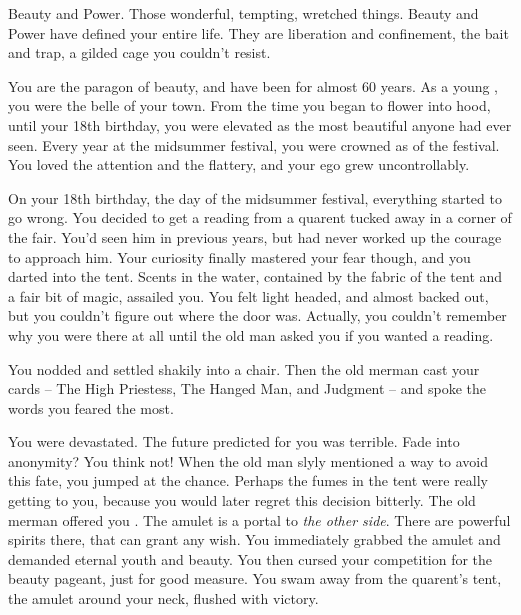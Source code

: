 \documentclass[char]{NeptuneBall}
\begin{document}
\name{\cWitch{}}




Beauty and Power. Those wonderful, tempting, wretched things. Beauty and Power have defined your entire life. They are liberation and confinement, the bait and trap, a gilded cage you couldn't resist.

You are the paragon of beauty, and have been for almost 60 years. As a young \cWitch{\mer}, you were the belle of your town. From the time you began to flower into \cWitch{\human}hood, until your 18th birthday, you were elevated as the most beautiful \cWitch{\mer} anyone had ever seen. Every year at the midsummer festival, you were crowned as \cWitch{\King} of the festival. You loved the attention and the flattery, and your ego grew uncontrollably.

On your 18th birthday, the day of the midsummer festival, everything started to go wrong. You decided to get a reading from a quarent tucked away in a corner of the fair. You'd seen him in previous years, but had never worked up the courage to approach him. Your curiosity finally mastered your fear though, and you darted into the tent. Scents in the water, contained by the fabric of the tent and a fair bit of magic, assailed you. You felt light headed, and almost backed out, but you couldn't figure out where the door was. Actually, you couldn't remember why you were there at all until the old man asked you if you wanted a reading.

You nodded and settled shakily into a chair. Then the old merman cast your cards -- The High Priestess, The Hanged Man, and Judgment -- and spoke the words you feared the most.

You were devastated. The future predicted for you was terrible. Fade into anonymity? You think not! When the old man slyly mentioned a way to avoid this fate, you jumped at the chance. Perhaps the fumes in the tent were really getting to you, because you would later regret this decision bitterly. The old merman offered you \iAmulet{\MYname}. The amulet is a portal to \emph{the other side}. There are powerful spirits there, that can grant any wish. You immediately grabbed the amulet and demanded eternal youth and beauty. You then cursed your competition for the beauty pageant, just for good measure. You swam away from the quarent's tent, the amulet around your neck, flushed with victory. 
\end{document}
